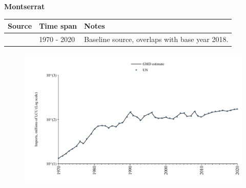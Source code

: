\documentclass[12pt,a4paper,landscape]{article}
\begin{document}
\begin{adjustbox}{max totalsize={\paperwidth}{\paperheight},center}
\begin{minipage}[t][\textheight][t]{\textwidth}
\vspace*{0.5cm}
{}
\begin{center}
{\Large\bfseries Montserrat}
\end{center}
\vspace{0.5cm}
\begin{table}[H]
\centering
\small
\begin{tabular}{|l|l|l|}
\hline
\textbf{Source} & \textbf{Time span} & \textbf{Notes} \\
\hline
\rowcolor{white}\cite{UN}& 1970 - 2020 &Baseline source, overlaps with base year 2018.\\
\hline
\end{tabular}
\end{table}
\begin{figure}[H]
\centering
\includegraphics[width=\textwidth,height=0.6\textheight,keepaspectratio]{graphs/MSR_imports.pdf}
\end{figure}
\end{minipage}
\end{adjustbox}
\end{document}
